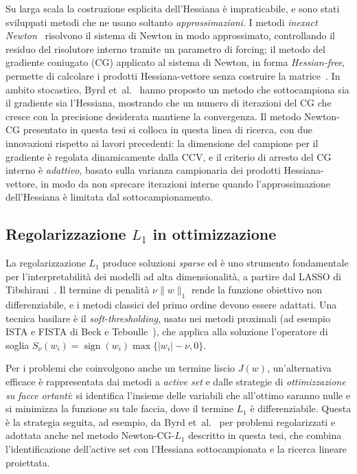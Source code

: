 Su larga scala la costruzione esplicita dell'Hessiana è impraticabile, e sono
stati sviluppati metodi che ne usano soltanto \emph{approssimazioni}. I metodi
\emph{inexact Newton}~\cite{dembo1982} risolvono il sistema di Newton in modo
approssimato, controllando il residuo del risolutore interno tramite un
parametro di forcing; il metodo del gradiente coniugato (CG) applicato al
sistema di Newton, in forma \emph{Hessian-free}, permette di calcolare i
prodotti Hessiana-vettore senza costruire la matrice~\cite{shewchuk1994,
nocedal2006}. In ambito stocastico, Byrd et~al.~\cite{byrd2011} hanno proposto
un metodo che sottocampiona sia il gradiente sia l'Hessiana, mostrando che un
numero di iterazioni del CG che cresce con la precisione desiderata mantiene la
convergenza. Il metodo Newton-CG presentato in questa tesi si colloca in questa
linea di ricerca, con due innovazioni rispetto ai lavori precedenti: la
dimensione del campione per il gradiente è regolata dinamicamente dalla CCV, e
il criterio di arresto del CG interno è \emph{adattivo}, basato sulla varianza
campionaria dei prodotti Hessiana-vettore, in modo da non sprecare iterazioni
interne quando l'approssimazione dell'Hessiana è limitata dal sottocampionamento.

\subsection{Regolarizzazione $L_1$ in ottimizzazione}

La regolarizzazione $L_1$ produce soluzioni \emph{sparse} ed è uno strumento
fondamentale per l'interpretabilità dei modelli ad alta dimensionalità, a
partire dal LASSO di Tibshirani~\cite{tibshirani1996}. Il termine di penalità
$\nu\|w\|_1$ rende la funzione obiettivo non differenziabile, e i metodi classici
del primo ordine devono essere adattati. Una tecnica basilare è il
\emph{soft-thresholding}, usato nei metodi proximali (ad esempio ISTA e FISTA
di Beck e Teboulle~\cite{beck2009}), che applica alla soluzione l'operatore di
soglia $S_\nu(w_i) = \operatorname{sign}(w_i)\max\{|w_i| - \nu, 0\}$.

Per i problemi che coinvolgono anche un termine liscio $J(w)$, un'alternativa
efficace è rappresentata dai metodi a \emph{active set} e dalle strategie di
\emph{ottimizzazione su facce ortanti}: si identifica l'insieme delle variabili
che all'ottimo saranno nulle e si minimizza la funzione su tale faccia, dove il
termine $L_1$ è differenziabile. Questa è la strategia seguita, ad esempio, da
Byrd et~al.~\cite{byrd2011} per problemi regolarizzati e adottata anche nel
metodo Newton-CG-$L_1$ descritto in questa tesi, che combina l'identificazione
dell'active set con l'Hessiana sottocampionata e la ricerca lineare proiettata.

